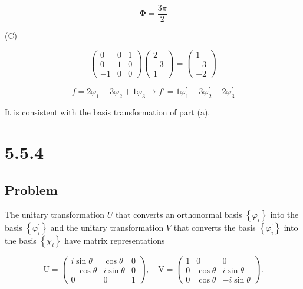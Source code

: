 \documentclass[12pt]{article}
\begin{document}
\[
    \boldsymbol{\Phi} = \frac{3\pi}{2}
\]

(C)

\[
    \begin{pmatrix}
        0  & 0 & 1 \\
        0  & 1 & 0 \\
        -1 & 0 & 0
    \end{pmatrix}
    \begin{pmatrix}
        2  \\
        -3 \\
        1
    \end{pmatrix}
    =
    \begin{pmatrix}
        1  \\
        -3 \\
        -2
    \end{pmatrix}
\]

\[
    f = 2 \varphi_1 - 3 \varphi_2 + 1 \varphi_3 \rightarrow f' = 1 \varphi_1^{\prime} - 3 \varphi_2^{\prime} - 2 \varphi_3^{\prime}
\]

It is consistent with the basis transformation of part (a).

\newpage
\section{5.5.4}

\subsection{Problem}

The unitary transformation \(U\) that converts an orthonormal basis \(\left\{\varphi_i\right\}\) into the basis \(\left\{\varphi_i^{\prime}\right\}\) and the unitary transformation \(V\) that converts the basis \(\left\{\varphi_i^{\prime}\right\}\) into the basis \(\left\{\chi_i\right\}\) have matrix representations

\[
    \mathrm{U}=\left(\begin{array}{ccc}
            i \sin \theta & \cos \theta   & 0 \\
            -\cos \theta  & i \sin \theta & 0 \\
            0             & 0             & 1
        \end{array}\right), \quad \mathrm{V}=\left(\begin{array}{ccc}
            1 & 0           & 0              \\
            0 & \cos \theta & i \sin \theta  \\
            0 & \cos \theta & -i \sin \theta
        \end{array}\right) .
\]
\end{document}
